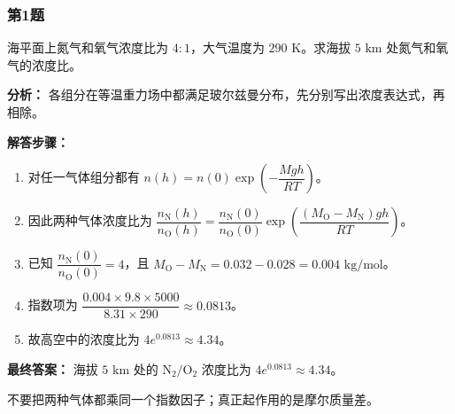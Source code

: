 \documentclass[12pt,a4paper]{ctexart}
\begin{document}
\subsubsection*{第1题}
\begin{tcolorbox}[colback=gray!2!white,colframe=black!60,title={题目}]
海平面上氮气和氧气浓度比为 \(4:1\)，大气温度为 \(290\text{ K}\)。求海拔 \(5\text{ km}\) 处氮气和氧气的浓度比。\par
\end{tcolorbox}
\begin{tcolorbox}[colback=blue!2!white,colframe=blue!55!black,title={完整答案}]
\textbf{分析：}
各组分在等温重力场中都满足玻尔兹曼分布，先分别写出浓度表达式，再相除。\par
\textbf{解答步骤：}
\begin{enumerate}
\item 对任一气体组分都有 \(n(h)=n(0)\exp\!\left(-\dfrac{Mgh}{RT}\right)\)。
\item 因此两种气体浓度比为 \(\dfrac{n_{\mathrm N}(h)}{n_{\mathrm O}(h)}=\dfrac{n_{\mathrm N}(0)}{n_{\mathrm O}(0)}\exp\!\left(\dfrac{(M_{\mathrm O}-M_{\mathrm N})gh}{RT}\right)\)。
\item 已知 \(\dfrac{n_{\mathrm N}(0)}{n_{\mathrm O}(0)}=4\)，且 \(M_{\mathrm O}-M_{\mathrm N}=0.032-0.028=0.004\text{ kg/mol}\)。
\item 指数项为 \(\dfrac{0.004\times 9.8\times 5000}{8.31\times 290}\approx 0.0813\)。
\item 故高空中的浓度比为 \(4e^{0.0813}\approx 4.34\)。
\end{enumerate}
\textbf{最终答案：}
海拔 \(5\text{ km}\) 处的 \(\mathrm N_2/\mathrm O_2\) 浓度比为 \(4e^{0.0813}\approx 4.34\)。\par
\end{tcolorbox}
\begin{tcolorbox}[colback=red!2!white,colframe=red!55!black,title={易错点}]
不要把两种气体都乘同一个指数因子；真正起作用的是摩尔质量差。\par
\end{tcolorbox}
\end{document}
